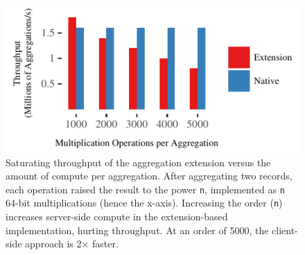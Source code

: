 \begin{figure}[t]
\centering
\includegraphics[width=1.0\columnwidth]{graphs/aggregate-mul-throughput.pdf}
  \caption{Saturating throughput of the aggregation extension versus the
    amount of compute per aggregation. After aggregating two records, each
    operation raised the result to the power \texttt{n}, implemented as
    \texttt{n} 64-bit multiplications (hence the x-axis). Increasing the
    order (\texttt{n}) increases server-side compute in the
    extension-based implementation, hurting throughput. At an order of
    5000, the client-side approach is 2$\times$ faster.}
\label{fig:aggregate-mul-sizes}
\end{figure}

